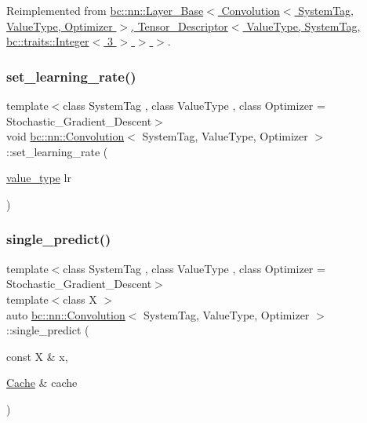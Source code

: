 Reimplemented from \hyperlink{structbc_1_1nn_1_1Layer__Base_a9613e51db3c27e64ced09e41d2e7f15c}{bc\+::nn\+::\+Layer\+\_\+\+Base$<$ Convolution$<$ System\+Tag, Value\+Type, Optimizer $>$, Tensor\+\_\+\+Descriptor$<$ Value\+Type, System\+Tag, bc\+::traits\+::\+Integer$<$ 3 $>$ $>$ $>$}.

\mbox{\label{structbc_1_1nn_1_1Convolution_a023bbc5d98a0a005a092b07353bd608a}} 
\subsubsection{\texorpdfstring{set\+\_\+learning\+\_\+rate()}{set\_learning\_rate()}}
{\footnotesize\ttfamily template$<$class System\+Tag , class Value\+Type , class Optimizer  = Stochastic\+\_\+\+Gradient\+\_\+\+Descent$>$ \\
void \hyperlink{structbc_1_1nn_1_1Convolution}{bc\+::nn\+::\+Convolution}$<$ System\+Tag, Value\+Type, Optimizer $>$\+::set\+\_\+learning\+\_\+rate (\begin{DoxyParamCaption}\item[{\hyperlink{structbc_1_1nn_1_1Convolution_ad57a7bb1413ba889d475bfafac3c8461}{value\+\_\+type}}]{lr }\end{DoxyParamCaption})\hspace{0.3cm}{\ttfamily [inline]}}

\mbox{\label{structbc_1_1nn_1_1Convolution_abad1b5837d3b22637c254d7dafecbb8c}} 
\subsubsection{\texorpdfstring{single\+\_\+predict()}{single\_predict()}}
{\footnotesize\ttfamily template$<$class System\+Tag , class Value\+Type , class Optimizer  = Stochastic\+\_\+\+Gradient\+\_\+\+Descent$>$ \\
template$<$class X $>$ \\
auto \hyperlink{structbc_1_1nn_1_1Convolution}{bc\+::nn\+::\+Convolution}$<$ System\+Tag, Value\+Type, Optimizer $>$\+::single\+\_\+predict (\begin{DoxyParamCaption}\item[{const X \&}]{x,  }\item[{\hyperlink{structbc_1_1nn_1_1Cache}{Cache} \&}]{cache }\end{DoxyParamCaption})\hspace{0.3cm}{\ttfamily [inline]}}

